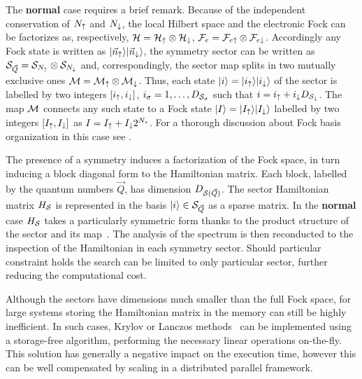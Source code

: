 \documentclass[edipack2.tex]{subfiles}
\begin{document}
The {\bf normal} case requires a brief remark. Because of the
independent conservation of $N_\uparrow$ and $N_\downarrow$, the local Hilbert
space and the electronic Fock can be factorizes as, respectively,
${\cal H}={\cal H}_\uparrow\otimes{\cal H}_\downarrow$, ${\cal F}_e = {\cal F}_{e\uparrow}\otimes {\cal F}_{e\downarrow}$.  
Accordingly any Fock state is written as $|\vec{n}_\uparrow\rangle|\vec{n}_\downarrow\rangle$, the symmetry sector can be written as  ${\cal S}_{\vec{Q}} = {\cal S}_{N_\uparrow}\otimes
{\cal S}_{N_\downarrow}$ and, correspondingly, the sector map splits in two
mutually exclusive ones ${\cal M} = {\cal M}_\uparrow
\otimes {\cal M}_\downarrow$.
Thus, each state $|i\rangle=|i_\uparrow\rangle|i_\downarrow\rangle$ of the
sector is labelled by two integers $[i_\uparrow,i_\downarrow]$, 
$i_\sigma=1,\dots,D_{{\cal S}_\sigma}$ such that $i=i_\uparrow + i_\downarrow
D_{{\cal S}_\downarrow}$. The map ${\cal M}$ connects any such state to a Fock state
$|I\rangle=|I_\uparrow\rangle|I_\downarrow\rangle$ labelled by two integers
$[I_\uparrow,I_\downarrow]$ as $I=I_\uparrow +   I_\downarrow 2^{N_s}$. For a thorough
discussion about Fock basis organization in this case see
. 

The presence of a symmetry induces a factorization of the Fock space,
in turn inducing a block diagonal form to the Hamiltonian matrix.
Each block, labelled by the quantum numbers $\vec{Q}$, has dimension
$D_{{\cal S}(\vec{Q})}$. The sector Hamiltonian matrix $H_{\cal S}$ is represented in the
basis $|i\rangle\in{\cal S}_{\vec{Q}}$ as a sparse matrix. In the {\bf
  normal} case $H_{\cal S}$ takes a particularly symmetric form thanks to
the product structure of the sector and its map~\cite{amaricci2022}.
The analysis of the spectrum is then reconducted to the inspection of
the Hamiltonian in each symmetry sector. Should particular constraint
holds the search can be limited to only particular sector, further
reducing the computational cost. 

Although the sectors have dimensions much smaller than the full Fock
space, for large systems storing the Hamiltonian matrix in the memory
can still be highly inefficient.
In such cases, Krylov or Lanczos methods~\cite{Lanczos1950JRNBSB,Lin1993CIP,Lehoucq1998,Maschhoff1996} can
be implemented using a storage-free algorithm, performing the
necessary linear operations on-the-fly.
This solution has generally a negative impact on the execution
time, however this can be well compensated by scaling in a distributed 
parallel framework.
\end{document}
